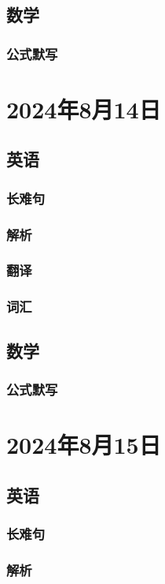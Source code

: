 \documentclass[UTF8]{ctexart}
\begin{document}
\subsection{数学}
\subsubsection{公式默写}
\begin{multicols}{2}
\end{multicols}
\section{2024年8月14日}
\subsection{英语}
\subsubsection{长难句}
\subsubsection{解析}
\subsubsection{翻译}
\subsubsection{词汇}
\subsection{数学}
\subsubsection{公式默写}
\begin{multicols}{2}
\end{multicols}
\section{2024年8月15日}
\subsection{英语}
\subsubsection{长难句}
\subsubsection{解析}
\end{document}
